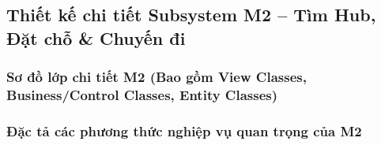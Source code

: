 \subsection{Thiết kế chi tiết Subsystem M2 – Tìm Hub, Đặt chỗ \& Chuyến đi}

\subsubsection{Sơ đồ lớp chi tiết M2 (Bao gồm View Classes, Business/Control Classes, Entity Classes)}


\subsubsection{Đặc tả các phương thức nghiệp vụ quan trọng của M2}

